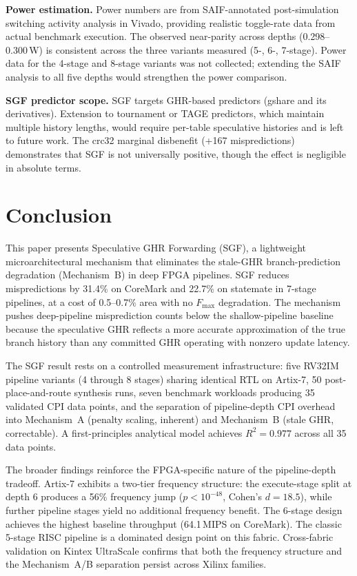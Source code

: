\documentclass[journal]{IEEEtran}
\begin{document}
\begin{table}[t]
\begin{table}[t]
\begin{table}[t]
\begin{table}[t]
\begin{table}[t]
\begin{table}[t]
\begin{table}[t]
\textbf{Power estimation.} Power numbers are from SAIF-annotated post-simulation switching activity analysis in Vivado, providing realistic toggle-rate data from actual benchmark execution. The observed near-parity across depths (0.298--0.300\,W) is consistent across the three variants measured (5-, 6-, 7-stage). Power data for the 4-stage and 8-stage variants was not collected; extending the SAIF analysis to all five depths would strengthen the power comparison.

\textbf{SGF predictor scope.} SGF targets GHR-based predictors (gshare and its derivatives). Extension to tournament or TAGE predictors, which maintain multiple history lengths, would require per-table speculative histories and is left to future work. The crc32 marginal disbenefit (+167 mispredictions) demonstrates that SGF is not universally positive, though the effect is negligible in absolute terms.

\section{Conclusion}

This paper presents Speculative GHR Forwarding (SGF), a lightweight microarchitectural mechanism that eliminates the stale-GHR branch-prediction degradation (Mechanism~B) in deep FPGA pipelines. SGF reduces mispredictions by 31.4\% on CoreMark and 22.7\% on statemate in 7-stage pipelines, at a cost of 0.5--0.7\% area with no $F_{\max}$ degradation. The mechanism pushes deep-pipeline misprediction counts below the shallow-pipeline baseline because the speculative GHR reflects a more accurate approximation of the true branch history than any committed GHR operating with nonzero update latency.

The SGF result rests on a controlled measurement infrastructure: five RV32IM pipeline variants (4 through 8 stages) sharing identical RTL on Artix-7, 50 post-place-and-route synthesis runs, seven benchmark workloads producing 35 validated CPI data points, and the separation of pipeline-depth CPI overhead into Mechanism~A (penalty scaling, inherent) and Mechanism~B (stale GHR, correctable). A first-principles analytical model achieves $R^2 = 0.977$ across all 35 data points.

The broader findings reinforce the FPGA-specific nature of the pipeline-depth tradeoff. Artix-7 exhibits a two-tier frequency structure: the execute-stage split at depth 6 produces a 56\% frequency jump ($p < 10^{-48}$, Cohen's $d = 18.5$), while further pipeline stages yield no additional frequency benefit. The 6-stage design achieves the highest baseline throughput (64.1\,MIPS on CoreMark). The classic 5-stage RISC pipeline is a dominated design point on this fabric. Cross-fabric validation on Kintex UltraScale confirms that both the frequency structure and the Mechanism~A/B separation persist across Xilinx families.


\end{table}
\end{table}
\end{table}
\end{table}
\end{table}
\end{table}
\end{table}
\end{document}
